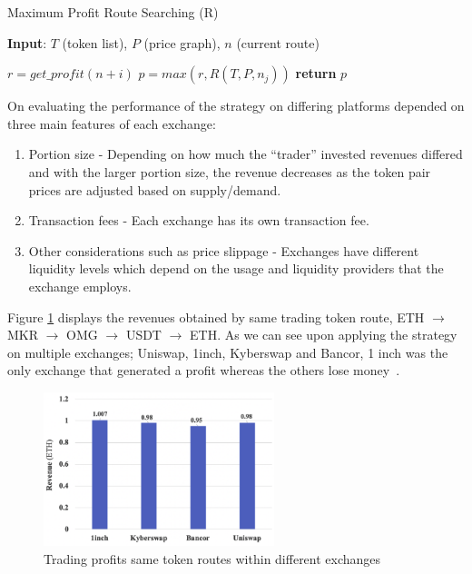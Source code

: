 \begin{algorithm}
    \caption{Maximum Profit Route Searching (R)}\label{alg:arb_sys_on_dex}
    \textbf{Input}: $T$ (token list), $P$ (price graph), $n$ (current route)
    \begin{algorithmic}
        \State $r = get\_profit(n+i)$
        \State $p = max(r, R(T, P, n_j))$
        \EndFor
        \EndFor
        \State \textbf{return} $p$
    \end{algorithmic}
\end{algorithm}

\noindent On evaluating the performance of the strategy on differing platforms depended on three main features of each exchange:
\begin{enumerate}
    \item Portion size - Depending on how much the ``trader'' invested revenues differed and with the larger portion size, the revenue decreases as the token pair prices are adjusted based on supply/demand.
    \item Transaction fees - Each exchange has its own transaction fee.
    \item Other considerations such as price slippage - Exchanges have different liquidity levels which depend on the usage and liquidity providers that the exchange employs.
\end{enumerate}

\noindent Figure \ref{fig:arb_on_diff_exchanges} displays the revenues obtained by same trading token route, ETH $\rightarrow$ MKR $\rightarrow$ OMG $\rightarrow$ USDT $\rightarrow$ ETH. As we can see upon applying the strategy on multiple exchanges; Uniswap, 1inch, Kyberswap and Bancor, 1 inch was the only exchange that generated a profit whereas the others lose money~\cite{boonpeam2021arbitrage}. 
\\[3mm]
\begin{figure}[!htb]
    \centering
    \includegraphics[width=0.6\textwidth]{background/Images/revenue_oncyclic_arb.png}
    \caption{Trading profits same token routes within different exchanges~\cite{boonpeam2021arbitrage} \label{fig:arb_on_diff_exchanges}}
\end{figure}

